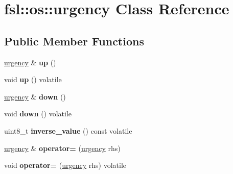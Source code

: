 \hypertarget{classfsl_1_1os_1_1urgency}{}\section{fsl\+::os\+::urgency Class Reference}
\label{classfsl_1_1os_1_1urgency}
\subsection*{Public Member Functions}
\begin{DoxyCompactItemize}
\item 
\mbox{\label{classfsl_1_1os_1_1urgency_abd8597e20c242963655794221a0adb67}} 
\mbox{\hyperlink{classfsl_1_1os_1_1urgency}{urgency}} \& {\bfseries up} ()
\item 
\mbox{\label{classfsl_1_1os_1_1urgency_aaf8e02ea8abeed5047fed5506f3e612c}} 
void {\bfseries up} () volatile
\item 
\mbox{\label{classfsl_1_1os_1_1urgency_abe035c32caaec91c4c65538afc949806}} 
\mbox{\hyperlink{classfsl_1_1os_1_1urgency}{urgency}} \& {\bfseries down} ()
\item 
\mbox{\label{classfsl_1_1os_1_1urgency_abda266fee789c5a54304dd21179f907d}} 
void {\bfseries down} () volatile
\item 
\mbox{\label{classfsl_1_1os_1_1urgency_a725217662582140b722e3775c49ae121}} 
uint8\+\_\+t {\bfseries inverse\+\_\+value} () const volatile
\item 
\mbox{\label{classfsl_1_1os_1_1urgency_ad4dd92dc7a22b39f695d45bbc95a387c}} 
\mbox{\hyperlink{classfsl_1_1os_1_1urgency}{urgency}} \& {\bfseries operator=} (\mbox{\hyperlink{classfsl_1_1os_1_1urgency}{urgency}} rhs)
\item 
\mbox{\label{classfsl_1_1os_1_1urgency_aac50098a661e7a2b77564567358574cc}} 
void {\bfseries operator=} (\mbox{\hyperlink{classfsl_1_1os_1_1urgency}{urgency}} rhs) volatile
\item 
\mbox{\label{classfsl_1_1os_1_1urgency_a7c22a40f4cae4cfb640e9ac817edb832}} 

\end{DoxyCompactItemize}
